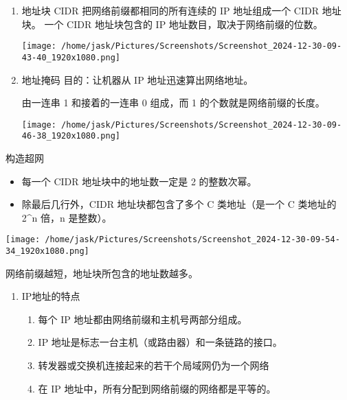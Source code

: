 \documentclass[11pt]{article}
\begin{document}
\begin{enumerate}
\begin{itemize}
\begin{enumerate}
\item 地址块
CIDR 把网络前缀都相同的所有连续的 IP 地址组成一个 CIDR 地址块。
一个 CIDR 地址块包含的 IP 地址数目，取决于网络前缀的位数。

\begin{center}
\texttt{[image: /home/jask/Pictures/Screenshots/Screenshot\_2024-12-30-09-43-40\_1920x1080.png]}
\end{center}

\item 地址掩码
目的：让机器从 IP 地址迅速算出网络地址。

由一连串 1 和接着的一连串 0 组成，而 1 的个数就是网络前缀的长度。

\begin{center}
\texttt{[image: /home/jask/Pictures/Screenshots/Screenshot\_2024-12-30-09-46-38\_1920x1080.png]}
\end{center}
\end{enumerate}

构造超网
\begin{itemize}
\item 每一个 CIDR 地址块中的地址数一定是 2 的整数次幂。

\item 除最后几行外，CIDR 地址块都包含了多个 C 类地址（是一个 C 类地址的 2\^{}n 倍，n 是整数）。
\end{itemize}

\begin{center}
\texttt{[image: /home/jask/Pictures/Screenshots/Screenshot\_2024-12-30-09-54-34\_1920x1080.png]}
\end{center}

网络前缀越短，地址块所包含的地址数越多。
\end{itemize}
\begin{enumerate}
\item IP地址的特点
\label{sec:orgd6ae9cf}

\begin{enumerate}
\item 每个 IP 地址都由网络前缀和主机号两部分组成。

\item IP 地址是标志一台主机（或路由器）和一条链路的接口。

\item 转发器或交换机连接起来的若干个局域网仍为一个网络

\item 在 IP 地址中，所有分配到网络前缀的网络都是平等的。
\end{enumerate}


\end{enumerate}
\end{enumerate}
\end{document}

